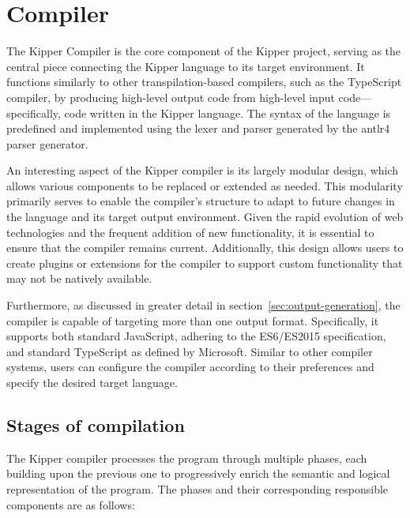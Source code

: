 \section{Compiler}
\label{sec:compiler}

The Kipper Compiler is the core component of the Kipper project, serving as the central piece connecting the Kipper language to its target environment. It functions similarly to other \gls{transpilation}-based compilers, such as the TypeScript compiler, by producing high-level output code from high-level input code—specifically, code written in the Kipper language. The syntax of the language is predefined and implemented using the lexer and parser generated by the \Gls{antlr4} parser generator. 

An interesting aspect of the Kipper compiler is its largely modular design, which allows various components to be replaced or extended as needed. This modularity primarily serves to enable the compiler's structure to adapt to future changes in the language and its target output environment. Given the rapid evolution of web technologies and the frequent addition of new functionality, it is essential to ensure that the compiler remains current. Additionally, this design allows users to create plugins or extensions for the compiler to support custom functionality that may not be natively available.

Furthermore, as discussed in greater detail in section~\ref{sec:output-generation}, the compiler is capable of targeting more than one output format. Specifically, it supports both standard JavaScript, adhering to the ES6/ES2015 specification, and standard TypeScript as defined by Microsoft. Similar to other compiler systems, users can configure the compiler according to their preferences and specify the desired target language.

\subsection{Stages of compilation}

The Kipper compiler processes the program through multiple phases, each building upon the previous one to progressively enrich the semantic and logical representation of the program. The phases and their corresponding responsible components are as follows:

